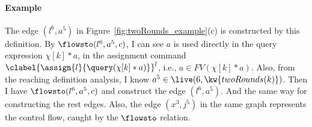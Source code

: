   \paragraph*{Example}
%
The edge $(l^6, a^5)$ in Figure~\ref{fig:twoRounds_example}(c) is constructed by this definition.
By $\flowsto(l^6, a^5, c)$, I can see $a$ is used directly in the query expression $\chi[k]*a$,
in the assignment command $\clabel{\assign{l}{\query(\chi[k]*a)}}^l$,
i.e., $a \in FV(\chi[k]*a)$.
Also, from the reaching definition analysis, I know $a^5 \in \live(6, \kw{twoRounds(k)})$.
Then I have $\flowsto(l^6, a^5, c)$ and construct the edge $(l^6, a^5)$.
And the same way for constructing the rest edges. Also, the edge $(x^3,j^5)$ in the same graph represents the control flow, 
caught by the $\flowsto$ relation.

